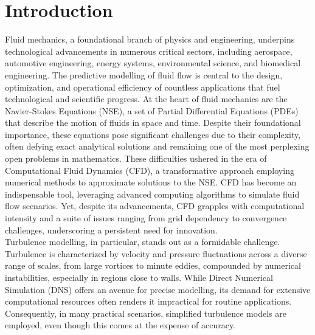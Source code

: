 \chapter{Introduction}
\label{chap:Intro}
Fluid mechanics, a foundational branch of physics and engineering, underpins technological advancements in numerous critical sectors, including aerospace, automotive engineering, energy systems, environmental science, and biomedical engineering. The predictive modelling of fluid flow is central to the design, optimization, and operational efficiency of countless applications that fuel technological and scientific progress. At the heart of fluid mechanics are the Navier-Stokes Equations (NSE), a set of Partial Differential Equations (PDEs) that describe the motion of fluids in space and time. Despite their foundational importance, these equations pose significant challenges due to their complexity, often defying exact analytical solutions and remaining one of the most perplexing open problems in mathematics. These difficulties ushered in the era of Computational Fluid Dynamics (CFD), a transformative approach employing numerical methods to approximate solutions to the NSE. CFD has become an indispensable tool, leveraging advanced computing algorithms to simulate fluid flow scenarios. Yet, despite its advancements, CFD grapples with computational intensity and a suite of issues ranging from grid dependency to convergence challenges, underscoring a persistent need for innovation.\\
Turbulence modelling, in particular, stands out as a formidable challenge. Turbulence is characterized by velocity and pressure fluctuations across a diverse range of scales, from large vortices to minute eddies, compounded by numerical instabilities, especially in regions close to walls. While Direct Numerical Simulation (DNS) offers an avenue for precise modelling, its demand for extensive computational resources often renders it impractical for routine applications. Consequently, in many practical scenarios, simplified turbulence models are employed, even though this comes at the expense of accuracy.\\
